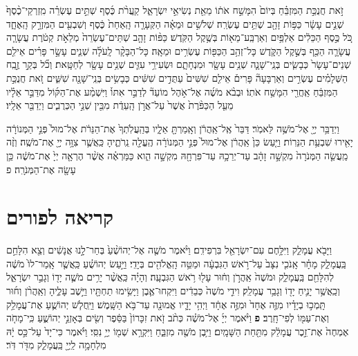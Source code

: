 \documentclass[twoside, openany, parskip=half, 11pt]{book}
\begin{document}
\begin{footnotesize}
\begin{multicols}{2}
זֹ֣את חֲנֻכַּ֣ת הַמִּזְבֵּ֗חַ בְּיוֹם֙ הִמָּשַׁ֣ח אֹת֔וֹ מֵאֵ֖ת נְשִׂיאֵ֣י יִשְׂרָאֵ֑ל קַֽעֲרֹ֨ת כֶּ֜סֶף שְׁתֵּ֣ים עֶשְׂרֵ֗ה מִֽזְרְקֵי־כֶ֨סֶף֙ שְׁנֵ֣ים עָשָׂ֔ר כַּפּ֥וֹת זָהָ֖ב שְׁתֵּ֥ים עֶשְׂרֵֽה׃ שְׁלֹשִׁ֣ים וּמֵאָ֗ה הַקְּעָרָ֤ה הָֽאַחַת֙ כֶּ֔סֶף וְשִׁבְעִ֖ים הַמִּזְרָ֣ק הָֽאֶחָ֑ד כֹּ֚ל כֶּ֣סֶף הַכֵּלִ֔ים אַלְפַּ֥יִם וְאַרְבַּֽע־מֵא֖וֹת בְּשֶׁ֥קֶל הַקֹּֽדֶשׁ׃ כַּפּ֨וֹת זָהָ֤ב שְׁתֵּים־עֶשְׂרֵה֙ מְלֵאֹ֣ת קְטֹ֔רֶת עֲשָׂרָ֧ה עֲשָׂרָ֛ה הַכַּ֖ף בְּשֶׁ֣קֶל הַקֹּ֑דֶשׁ כָּל־זְהַ֥ב הַכַּפּ֖וֹת עֶשְׂרִ֥ים וּמֵאָֽה׃ כָּל־הַבָּקָ֨ר לָֽעֹלָ֜ה שְׁנֵ֧ים עָשָׂ֣ר פָּרִ֗ים אֵילִ֤ם שְׁנֵים־עָשָׂר֙ כְּבָשִׂ֧ים בְּנֵֽי־שָׁנָ֛ה שְׁנֵ֥ים עָשָׂ֖ר וּמִנְחָתָ֑ם וּשְׂעִירֵ֥י עִזִּ֛ים שְׁנֵ֥ים עָשָׂ֖ר לְחַטָּֽאת׃ וְכֹ֞ל בְּקַ֣ר זֶ֣בַֽח הַשְּׁלָמִ֗ים עֶשְׂרִ֣ים וְאַרְבָּעָה֘ פָּרִים֒ אֵילִ֤ם שִׁשִּׁים֙ עַתֻּדִ֣ים שִׁשִּׁ֔ים כְּבָשִׂ֥ים בְּנֵֽי־שָׁנָ֖ה שִׁשִּׁ֑ים זֹ֚את חֲנֻכַּ֣ת הַמִּזְבֵּ֔חַ אַֽחֲרֵ֖י הִמָּשַׁ֥ח אֹתֽוֹ׃ וּבְבֹ֨א מֹשֶׁ֜ה אֶל־אֹ֣הֶל מוֹעֵד֘ לְדַבֵּ֣ר אִתּוֹ֒ וַיִּשְׁמַ֨ע אֶת־הַקּ֜וֹל מִדַּבֵּ֣ר אֵלָ֗יו מֵעַ֤ל הַכַּפֹּ֨רֶת֙ אֲשֶׁר֙ עַל־אֲרֹ֣ן הָֽעֵדֻ֔ת מִבֵּ֖ין שְׁנֵ֣י הַכְּרֻבִ֑ים וַיְדַבֵּ֖ר אֵלָֽיו׃


וַיְדַבֵּ֥ר יְיָ֖ אֶל־מֹשֶׁ֥ה לֵּאמֹֽר׃ דַּבֵּר֙ אֶֽל־אַֽהֲרֹ֔ן וְאָֽמַרְתָּ֖ אֵלָ֑יו בְּהַֽעֲלֹֽתְךָ֙ אֶת־הַנֵּרֹ֔ת אֶל־מוּל֙ פְּנֵ֣י הַמְּנוֹרָ֔ה יָאִ֖ירוּ שִׁבְעַ֥ת הַנֵּרֽוֹת׃ וַיַּ֤עַשׂ כֵּן֙ אַֽהֲרֹ֔ן אֶל־מוּל֙ פְּנֵ֣י הַמְּנוֹרָ֔ה הֶֽעֱלָ֖ה נֵֽרֹתֶ֑יהָ כַּֽאֲשֶׁ֛ר צִוָּ֥ה יְיָ֖ אֶת־מֹשֶֽׁה׃ וְזֶ֨ה מַֽעֲשֵׂ֤ה הַמְּנֹרָה֙ מִקְשָׁ֣ה זָהָ֔ב עַד־יְרֵכָ֥הּ עַד־פִּרְחָ֖הּ מִקְשָׁ֣ה הִ֑וא כַּמַּרְאֶ֗ה אֲשֶׁ֨ר הֶרְאָ֤ה יְיָ֙ אֶת־מֹשֶׁ֔ה כֵּ֥ן עָשָׂ֖ה אֶת־הַמְּנֹרָֽה׃ פ

\end{multicols}

\section[פורים]{קריאה לפורים}

\begin{multicols}{2}

וַיָּבֹ֖א עֲמָלֵ֑ק וַיִּלָּ֥חֶם עִם־יִשְׂרָאֵ֖ל בִּרְפִידִֽם׃ וַיֹּ֨אמֶר מֹשֶׁ֤ה אֶל־יְהוֹשֻׁ֨עַ֙ בְּחַר־לָ֣נוּ אֲנָשִׁ֔ים וְצֵ֖א הִלָּחֵ֣ם בַּֽעֲמָלֵ֑ק מָחָ֗ר אָֽנֹכִ֤י נִצָּב֙ עַל־רֹ֣אשׁ הַגִּבְעָ֔ה וּמַטֵּ֥ה הָֽאֱלֹהִ֖ים בְּיָדִֽי׃ וַיַּ֣עַשׂ יְהוֹשֻׁ֗עַ כַּֽאֲשֶׁ֤ר אָֽמַר־לוֹ֙ מֹשֶׁ֔ה לְהִלָּחֵ֖ם בַּֽעֲמָלֵ֑ק וּמֹשֶׁה֙ אַֽהֲרֹ֣ן וְח֔וּר עָל֖וּ רֹ֥אשׁ הַגִּבְעָֽה׃ 
 וְהָיָ֗ה כַּֽאֲשֶׁ֨ר יָרִ֥ים מֹשֶׁ֛ה יָד֖וֹ וְגָבַ֣ר יִשְׂרָאֵ֑ל וְכַֽאֲשֶׁ֥ר יָנִ֛יחַ יָד֖וֹ וְגָבַ֥ר עֲמָלֵֽק׃ וִידֵ֤י מֹשֶׁה֙ כְּבֵדִ֔ים וַיִּקְחוּ־אֶ֛בֶן וַיָּשִׂ֥ימוּ תַחְתָּ֖יו וַיֵּ֣שֶׁב עָלֶ֑יהָ וְאַֽהֲרֹ֨ן וְח֜וּר תָּֽמְכ֣וּ בְיָדָ֗יו מִזֶּ֤ה אֶחָד֙ וּמִזֶּ֣ה אֶחָ֔ד וַיְהִ֥י יָדָ֛יו אֱמוּנָ֖ה עַד־בֹּ֥א הַשָּֽׁמֶשׁ׃ וַיַּֽחֲל֧שׁ יְהוֹשֻׁ֛עַ אֶת־עֲמָלֵ֥ק וְאֶת־עַמּ֖וֹ לְפִי־חָֽרֶב׃ \textbf{פ} 
 וַיֹּ֨אמֶר יְיָ֜ אֶל־מֹשֶׁ֗ה כְּתֹ֨ב זֹ֤את זִכָּרוֹן֙ בַּסֵּ֔פֶר וְשִׂ֖ים בְּאָזְנֵ֣י יְהוֹשֻׁ֑עַ כִּֽי־מָחֹ֤ה אֶמְחֶה֙ אֶת־זֵ֣כֶר עֲמָלֵ֔ק מִתַּ֖חַת הַשָּׁמָֽיִם׃ וַיִּ֥בֶן מֹשֶׁ֖ה מִזְבֵּ֑חַ וַיִּקְרָ֥א שְׁמ֖וֹ יְיָ֥ נִסִּֽי׃ וַיֹּ֗אמֶר כִּי־יָד֙ עַל־כֵּ֣ס יָ֔הּ מִלְחָמָ֥ה לַֽיְיָ֖ בַּֽעֲמָלֵ֑ק מִדֹּ֖ר דֹּֽר׃


\end{multicols}
\end{footnotesize}
\end{document}
